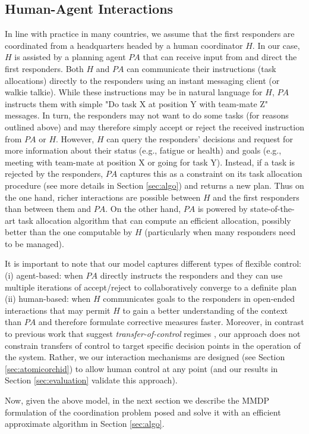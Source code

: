 \subsection{Human-Agent Interactions}
\noindent In line with practice in many countries, we assume that the first responders are coordinated from a headquarters headed by a human coordinator $H$. In our case, $H$ is assisted by a planning agent $PA$ that can receive input from and direct the first responders.   Both  $H$ and $PA$  can communicate their  instructions (task allocations) directly to the responders using an instant messaging client (or walkie talkie).  While these instructions may be in natural language for $H$, $PA$ instructs them with simple "Do task X at position Y with team-mate Z" messages. In turn, the responders may not want to do some tasks (for reasons outlined above) and may therefore simply accept or reject the received instruction from $PA$ or $H$. However, $H$ can query the responders' decisions and request for more information about their status (e.g., fatigue or health) and goals (e.g., meeting with team-mate at position X or going for task Y). Instead, if a task is rejected by the responders, $PA$ captures this as a constraint on its task allocation procedure (see more details in Section \ref{sec:algo}) and returns a new plan. Thus on the one hand, richer interactions are possible between $H$ and the first responders than between them and $PA$. On the other hand, $PA$ is powered by state-of-the-art task allocation algorithm that can compute an efficient allocation, possibly better than the one computable by $H$ (particularly when many responders need to be managed). 

It is important to note that our model captures different types of flexible control: (i) agent-based: when $PA$ directly instructs the responders  and they can use multiple iterations of accept/reject to collaboratively converge to a definite  plan (ii) human-based: when $H$ communicates goals to the responders in open-ended interactions that may permit $H$ to gain a better understanding of the context than $PA$ and therefore formulate corrective measures faster. Moreover, in contrast to previous work that suggest \emph{transfer-of-control} regimes \cite{scerri:etal:2005}, our approach does not constrain transfers of control to target specific decision points in the operation of the system. Rather, we our interaction mechanisms are designed (see Section \ref{sec:atomicorchid}) to allow human control at any point (and our results  in Section \ref{sec:evaluation} validate this approach). 

Now, given the above model,  in the next section we describe the MMDP formulation of the coordination problem posed and solve it with an efficient approximate algorithm in Section \ref{sec:algo}.



